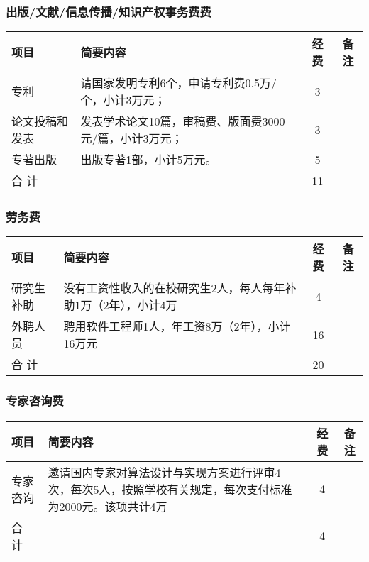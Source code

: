 \subsubsection{出版/文献/信息传播/知识产权事务费费}
\begin{table}[H]
	\centering
	\begin{tabular}{m{3cm} m{7.5cm} cc}
		\toprule
		项目     & 简要内容     & 经费 & 备注 \\
		\midrule
		专利 & 请国家发明专利6个，申请专利费0.5万/个，小计3万元； & 3   &      \\
		论文投稿和发表 & 发表学术论文10篇，审稿费、版面费3000元/篇，小计3万元； & 3   &      \\
		专著出版 & 出版专著1部，小计5万元。 & 5   &      \\
		合 计        &              & 11      \\
		\bottomrule
	\end{tabular}
\end{table}

\subsubsection{劳务费}
\begin{table}[H]
	\centering
	\begin{tabular}{m{3cm} m{7.5cm} cc}
		\toprule
		项目     & 简要内容     & 经费 & 备注 \\
		\midrule
		研究生补助 & 没有工资性收入的在校研究生2人，每人每年补助1万（2年），小计4万 & 4   &      \\
		外聘人员 & 聘用软件工程师1人，年工资8万（2年），小计16万元 & 16   &      \\
		合 计        &              & 20      \\
		\bottomrule
	\end{tabular}
\end{table}

\subsubsection{专家咨询费}
\begin{table}[H]
	\centering
	\begin{tabular}{m{3cm} m{7.5cm} cc}
		\toprule
		项目     & 简要内容     & 经费 & 备注 \\
		\midrule
		专家咨询 & 邀请国内专家对算法设计与实现方案进行评审4次，每次5人，按照学校有关规定，每次支付标准为2000元。该项共计4万 & 4   &      \\
		合 计        &              & 4      \\
		\bottomrule
	\end{tabular}
\end{table}

